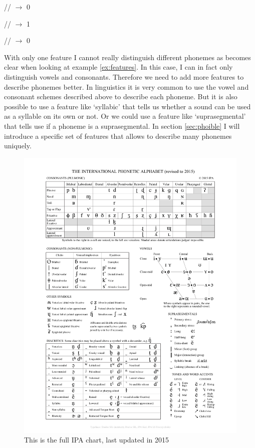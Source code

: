 \begin{covsubexamples}[preamble={The examples show how we can describe different phonemes using features. `1' stands for: `is-a-consonant'. `0' stands for: `is-not-a-consonant' (which means that it is a vowel).}]
\label{ex:features}
\item \label{ex:features1} // $\rightarrow$ 0
\item \label{ex:features2} // $\rightarrow$ 1
\item \label{ex:features3} // $\rightarrow$ 0
\end{covsubexamples}

With only one feature I cannot really distinguish different phonemes as becomes clear when looking at example \ref{ex:features}. In this case, I can in fact only distinguish vowels and consonants. Therefore we need to add more features to describe phonemes better. In linguistics it is very common to use the vowel and consonant schemes described above to describe each phoneme. But it is also possible to use a feature like `syllabic' that tells us whether a sound can be used as a syllable on its own or not. Or we could use a feature like `suprasegmental' that tells use if a phoneme is a suprasegmental. In section \ref{sec:phoible}  I will introduce a specific set of features that allows to describe many phonemes uniquely. 

\begin{figure}[h]
\vspace*{-1.5cm}
    \begin{center}
    \hspace*{-2cm}
      \includegraphics[width=1.3\linewidth]{ipa_chart.pdf}
    \end{center}
    \caption[Full IPA chart]{This is the full IPA chart, last updated in 2015}
    \label{fig:ipa_chart}
\end{figure}